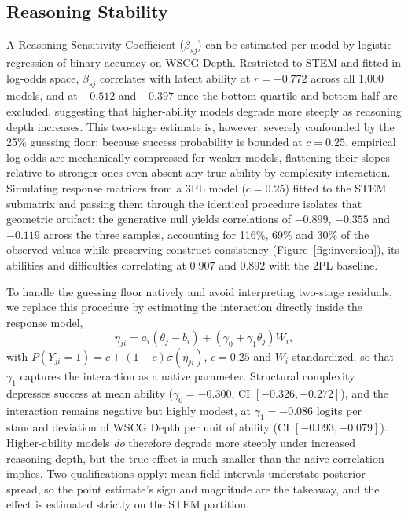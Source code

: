 \subsection{Reasoning Stability}\label{sec:inversion}

A Reasoning Sensitivity Coefficient ($\beta_{sj}$) can be estimated per model by logistic regression of binary accuracy on WSCG Depth. Restricted to STEM and fitted in log-odds space, $\beta_{sj}$ correlates with latent ability at $r = -0.772$ across all 1,000 models, and at $-0.512$ and $-0.397$ once the bottom quartile and bottom half are excluded, suggesting that higher-ability models degrade more steeply as reasoning depth increases. This two-stage estimate is, however, severely confounded by the 25\% guessing floor: because success probability is bounded at $c = 0.25$, empirical log-odds are mechanically compressed for weaker models, flattening their slopes relative to stronger ones even absent any true ability-by-complexity interaction. Simulating response matrices from a 3PL model ($c = 0.25$) fitted to the STEM submatrix and passing them through the identical procedure isolates that geometric artifact: the generative null yields correlations of $-0.899$, $-0.355$ and $-0.119$ across the three samples, accounting for 116\%, 69\% and 30\% of the observed values while preserving construct consistency (Figure~\ref{fig:inversion}), its abilities and difficulties correlating at $0.907$ and $0.892$ with the 2PL baseline.

To handle the guessing floor natively and avoid interpreting two-stage residuals, we replace this procedure by estimating the interaction directly inside the response model,
\[\eta_{ji} = a_{i}( \theta_{j} - b_{i} ) + ( \gamma_{0} + \gamma_{1}\theta_{j} )W_{i},\]
with $P( Y_{ji} = 1 ) = c + (1 - c)\sigma( \eta_{ji} )$, $c = 0.25$ and $W_{i}$ standardized, so that $\gamma_{1}$ captures the interaction as a native parameter. Structural complexity depresses success at mean ability ($\gamma_{0} = -0.300$, CI $[-0.326,-0.272]$), and the interaction remains negative but highly modest, at $\gamma_{1} = -0.086$ logits per standard deviation of WSCG Depth per unit of ability (CI $[-0.093,-0.079]$). Higher-ability models \emph{do} therefore degrade more steeply under increased reasoning depth, but the true effect is much smaller than the naive correlation implies. Two qualifications apply: mean-field intervals understate posterior spread, so the point estimate's sign and magnitude are the takeaway, and the effect is estimated strictly on the STEM partition.

